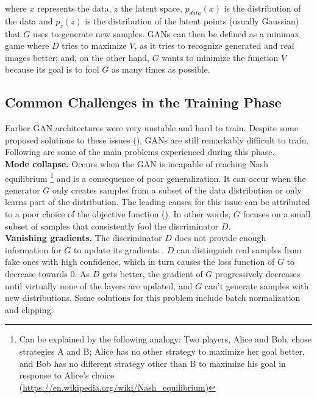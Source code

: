  \noindent where $x$ represents the data, $z$ the latent space,  $p_{data}(x)$ is the distribution of the data and $p_z(z)$ is the distribution of the latent points (usually Gaussian) that $G$ uses to generate new samples. GANs can then be defined as a minimax game where $D$ tries to maximize $V$, as it tries to recognize generated and real images better; and, on the other hand, $G$ wants to minimize the function $V$ because its goal is to fool $G$ as many times as possible. 


\subsection{Common Challenges in the Training Phase}
Earlier GAN architectures were very unstable and hard to train. Despite some proposed solutions to these issues (\cite{radford.etal_UnsupervisedRepresentationLearning_2016,arjovsky.etal_WassersteinGenerativeAdversarial_}), GANs are still remarkably difficult to train. Following are some of the main problems experienced during this phase.\\

\noindent\textbf{Mode collapse.} Occurs when the GAN is incapable of reaching Nash equilibrium \footnote{Can be explained by the following analogy: Two players, Alice and Bob, chose strategies A and B; Alice has no other strategy to maximize her goal better, and Bob has no different strategy other than B to maximize his goal in response to Alice's choice (\url{https://en.wikipedia.org/wiki/Nash_equilibrium})} and is a consequence of poor generalization. It can occur when the generator $G$ only creates samples from a subset of the data distribution or only learns part of the distribution. The leading causes for this issue can be attributed to a poor choice of the objective function (\cite{saxena.cao_GenerativeAdversarialNetworks_2022}). In other words, $G$ focuses on a small subset of samples that consistently fool the discriminator $D$.\\

\noindent\textbf{Vanishing gradients.} The discriminator $D$ does not provide enough information for $G$ to update its gradients \cite{little.etal_GenerativeAdversarialNetworks_2021}. $D$ can distinguish real samples from fake ones with high confidence, which in turn causes the loss function of $G$ to decrease towards 0. As $D$ gets better, the gradient of $G$ progressively decreases until virtually none of the layers are updated, and $G$ can't generate samples with new distributions. Some solutions for this problem include batch normalization and clipping.\\

